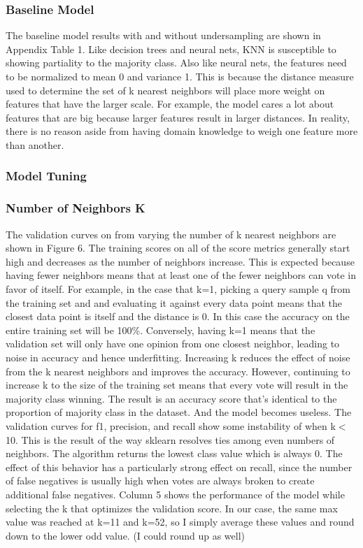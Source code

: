 \documentclass{article}
\begin{document}
\subsubsection*{Baseline Model}

The baseline model results with and without undersampling are shown in Appendix Table 1. Like decision trees and neural nets, KNN is susceptible to showing partiality to the majority class. Also like neural nets, the features need to be normalized to mean 0 and variance 1. This is because the distance measure used to determine the set of k nearest neighbors will place more weight on features that have the larger scale. For example, the model cares a lot about features that are big because larger features result in larger distances. In reality, there is no reason aside from having domain knowledge to weigh one feature more than another. 


\subsubsection*{Model Tuning}
\subsubsection*{Number of Neighbors K}

The validation curves on from varying the number of k nearest neighbors are shown in Figure 6. The training scores on all of the score metrics generally start high and decreases as the number of neighbors increase. This is expected because having fewer neighbors means that at least one of the fewer neighbors can vote in favor of itself. For example, in the case that k=1, picking a query sample q from the training set and and evaluating it against every data point means that the closest data point is itself and the distance is 0. In this case the accuracy on the entire training set will be 100\%. Conversely, having k=1 means that the validation set will only have one opinion from one closest neighbor, leading to noise in accuracy and hence underfitting. Increasing k reduces the effect of noise from the k nearest neighbors and improves the accuracy. However, continuing to increase k to the size of the training set means that every vote will result in the majority class winning. The result is an accuracy score that's identical to the proportion of majority class in the dataset. And the model becomes useless. The validation curves for f1, precision, and recall show some instability of when k$<$10. This is the result of the way sklearn resolves ties among even numbers of neighbors. The algorithm returns the lowest class value which is always 0. The effect of this behavior has a particularly strong effect on recall, since the number of false negatives is usually high when votes are always broken to create additional false negatives. Column 5 shows the performance of the model while selecting the k that optimizes the validation score. In our case, the same max value was reached at k=11 and k=52, so I simply average these values and round down to the lower odd value. (I could round up as well)
\end{document}
